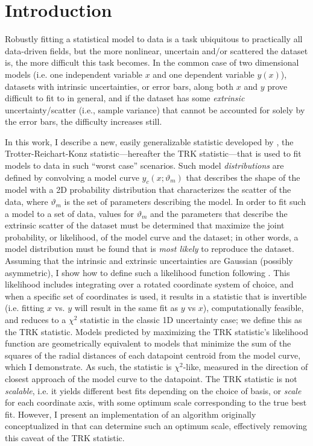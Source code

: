 \chapter{Introduction}
\label{cha:section_introduction}
Robustly fitting a statistical model to data is a task ubiquitous to practically all data-driven fields, but the more nonlinear, uncertain and/or scattered the dataset is, the more difficult this task becomes. In the common case of two dimensional models (i.e. one independent variable $x$ and one dependent variable $y(x)$), datasets with intrinsic uncertainties, or error bars, along both $x$ and $y$ prove difficult to fit to in general, and if the dataset has some \textit{extrinsic} uncertainty/scatter (i.e., sample variance) that cannot be accounted for solely by the error bars, the difficulty increases still.

In this work, I describe a new, easily generalizable statistic developed by \textcite{trotter}, the Trotter-Reichart-Konz statistic---hereafter the TRK statistic---that is used to fit models to data in such ``worst case'' scenarios. Such model \textit{distributions} are defined by convolving a model curve $y_c(x;\vartheta_m)$ that describes the shape of the model with a 2D probability distribution that characterizes the scatter of the data, where $\vartheta_m$ is the set of parameters describing the model. In order to fit such a model to a set of data, values for $\vartheta_m$ and the parameters that describe the extrinsic scatter of the dataset must be determined that maximize the joint probability, or likelihood, of the model curve and the dataset; in other words, a model distribution must be found that is \textit{most likely} to reproduce the dataset. Assuming that the intrinsic and extrinsic uncertainties are Gaussian (possibly asymmetric), I show how to define such a likelihood function following \textcite{trotter}. This likelihood includes integrating over a rotated coordinate system of choice, and when a specific set of coordinates is used, it results in a statistic that is invertible (i.e. fitting $x$ vs. $y$ will result in the same fit as $y$ vs $x$), computationally feasible, and reduces to a $\chi^2$ statistic in the classic 1D uncertainty case; we define this as the TRK statistic. Models predicted by maximizing the TRK statistic's likelihood function are geometrically equivalent to models that minimize the sum of the squares of the radial distances of each datapoint centroid from the model curve, which I demonstrate. As such, the statistic is $\chi^2$-like, measured in the direction of closest approach of the model curve to the datapoint. The TRK statistic is not \textit{scalable}, i.e. it yields different best fits depending on the choice of basis, or \textit{scale} for each coordinate axis, with some optimum scale corresponding to the true best fit. However, I present an implementation of an algorithm originally conceptualized in \textcite{trotter} that can determine such an optimum scale, effectively removing this caveat of the TRK statistic. 

